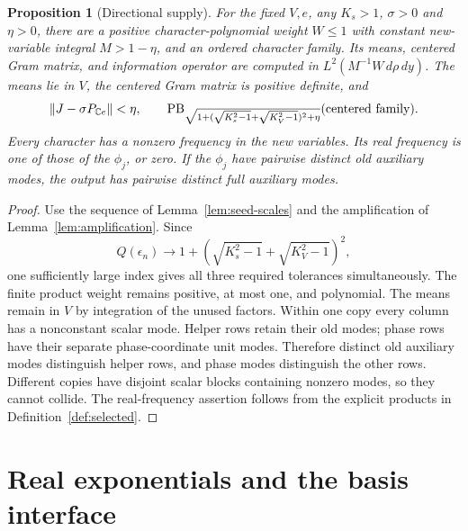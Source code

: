 \documentclass[reqno,a4paper,12pt]{amsart}
\newtheorem{proposition}[theorem]{Proposition}
\theoremstyle{definition}
\newcommand{\C}{\mathbb C}
\newcommand{\PB}{\operatorname{PB}}
\begin{document}
\begin{proposition}[Directional supply]\label{prop:directional}
For the fixed $V,e$, any $K_s>1$, $\sigma>0$ and $\eta>0$, there
are a positive character-polynomial weight $W\le1$ with constant
new-variable integral $M>1-\eta$, and an ordered character family.
Its means, centered Gram matrix, and information operator are computed
in $L^2(M^{-1}W\,d\rho\,dy)$. The means lie in $V$, the centered
Gram matrix is positive definite, and
\[
 \|J-\sigma P_{\C e}\|<\eta,\qquad
 \PB_{\sqrt{1+(\sqrt{K_s^2-1}+\sqrt{K_V^2-1})^2+\eta}}
       (\hbox{centered family}).
\]
Every character has a nonzero frequency in the new variables.
Its real frequency is one of those of the $\phi_j$, or zero.
If the $\phi_j$ have pairwise distinct old auxiliary modes, the
output has pairwise distinct full auxiliary modes.
\end{proposition}
\begin{proof}
Use the sequence of Lemma~\ref{lem:seed-scales} and the amplification
of Lemma~\ref{lem:amplification}.
Since
\[
 Q(\epsilon_n)\longrightarrow
 1+(\sqrt{K_s^2-1}+\sqrt{K_V^2-1})^2,
\]
one sufficiently large index gives all three required tolerances
simultaneously.
The finite product weight remains positive, at most one, and polynomial.
The means remain in $V$ by integration of the unused factors.
Within one copy every column has a nonconstant scalar mode.
Helper rows retain their old modes; phase rows have their separate
phase-coordinate unit modes. Therefore distinct old auxiliary modes
distinguish helper rows, and phase modes distinguish the other rows.
Different copies have disjoint scalar blocks containing nonzero modes,
so they cannot collide. The real-frequency assertion follows from the
explicit products in Definition~\ref{def:selected}.
\end{proof}

\section{Real exponentials and the basis interface}
\end{document}
